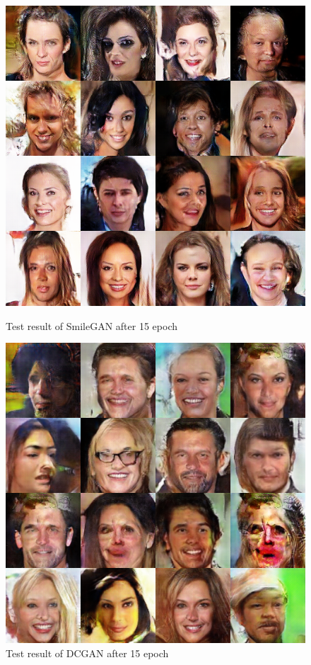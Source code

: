 \begin{figure}
    \begin{minipage}[t]{0.48\linewidth}
        \centering
        \includegraphics[width=\textwidth]{figures/result_smilegan_e15.png}
        \caption{Test result of SmileGAN after 15 epoch}
        \label{smilegan_e15}
    \end{minipage}
        \hfill
    \begin{minipage}[t]{0.48\linewidth}
        \centering
        \includegraphics[width=\textwidth]{figures/result_dcgan_e15.png}
        \caption{Test result of DCGAN after 15 epoch}
        \label{dcgan_e15}
    \end{minipage}
\end{figure}



